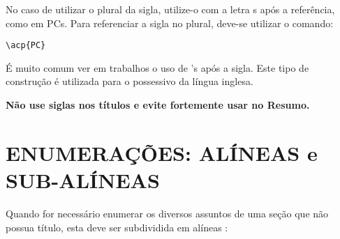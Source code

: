 No caso de utilizar o plural da sigla, utilize-o com a letra s após a referência, como em \acp{PC}. Para referenciar a sigla no plural, deve-se utilizar o comando:

\begingroup
\fontsize{10pt}{12pt}\selectfont
\verb!\acp{PC}! \newline
\endgroup

É muito comum ver em trabalhos o uso de 's após a sigla. Este tipo de construção é utilizada para o possessivo da língua inglesa. 

\textbf{Não use siglas nos títulos e evite fortemente usar no Resumo. }

\section{ENUMERAÇÕES: ALÍNEAS e SUB-ALÍNEAS}
\label{sec:enum} 

Quando for necessário enumerar os diversos assuntos de uma seção que não possua título, esta deve ser subdividida em alíneas \cite[4.2]{NBR6024:2012}:

